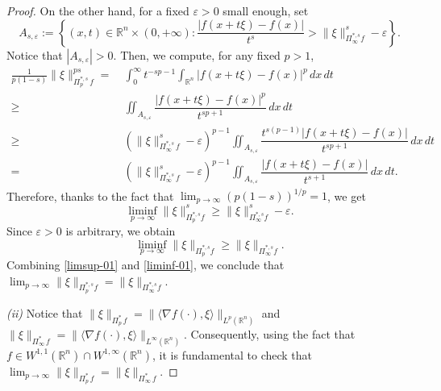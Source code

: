 \documentclass[11pt, reqno]{article}
\theoremstyle{definition}
\numberwithin{equation}{section}
\newcommand{\R}{\mathbb{R}}
\begin{document}
\begin{proof}
\medskip

On the other hand, for a fixed $\varepsilon > 0$ small enough, set
    \begin{equation}\label{A_s_epsi}
        A_{s, \varepsilon} := \left \{   (x, t) \in \R^n \times (0, + \infty): \dfrac{|f(x + t\xi) - f(x)|}{t^s} > \|\xi \|^s_{\Pi^{\ast, s}_\infty f} - \varepsilon \right\}.
    \end{equation}
Notice that $|A_{s, \varepsilon}| > 0$.
Then, we compute, for any fixed $p > 1$,
    \begin{equation}\label{est.A_s_epsi}
    	\begin{split}
         \frac{1}{p(1- s)}\|\xi\|^{ps}_{\Pi^{\ast, s}_p \, f} = & ~ \int_0^\infty t^{-sp - 1} \int_{\R^n} |f(x + t \xi) - f(x)|^p \, dx \, dt \\
         \geq &  ~  \iint_{A_{s, \varepsilon}} \dfrac{|f(x + t\xi) - f(x)|^p}{t^{sp + 1}} \, dx \, dt \\
         \geq & ~ \left( \| \xi \|^s_{\Pi^{\ast, s}_\infty \, f} - \varepsilon \right)^{p - 1} \iint_{A_{s,\varepsilon}} \dfrac{t^{s(p - 1)}|f(x +t\xi) - f(x)|}{t^{sp + 1}} \, dx \, dt  \\
         = & ~ \left( \| \xi \|^s_{\Pi^{\ast, s}_\infty \, f} - \varepsilon \right)^{p - 1}\iint_{A_{s, \varepsilon}} \dfrac{|f(x +t\xi) - f(x)|}{t^{s + 1}} \, dx \, dt.
         \end{split}
    \end{equation}
Therefore, thanks to the fact that $\textstyle\lim_{p \to \infty} (p(1-s))^{1/p} = 1$, we get
    \[
        \liminf_{p \to \infty} \| \xi \|^s_{\Pi^{\ast, s}_p f} \geq \| \xi \|^s_{\Pi^{\ast, s}_\infty f} - \varepsilon.
    \]
Since $\varepsilon > 0$ is arbitrary, we obtain
    \begin{equation}\label{liminf-01}
        \liminf_{p \to \infty} \| \xi \|_{\Pi^{\ast, s}_p f} \geq \| \xi \|_{\Pi^{\ast, s}_\infty f}.
    \end{equation}
Combining \eqref{limsup-01} and \eqref{liminf-01}, we conclude that $\textstyle\lim_{p \to \infty}  \| \xi \|_{\Pi^{\ast, s}_p f} = \| \xi \|_{\Pi^{\ast, s}_\infty  f}$.

\medskip

\textit{(ii)}
Notice that $\| \xi \|_{\Pi^\ast_p \, f} = \| \langle \nabla f (\cdot), \xi \rangle \|_{L^p(\R^n)}$ and $\| \xi \|_{\Pi^\ast_\infty \, f} = \| \langle \nabla f(\cdot), \xi \rangle \|_{L^\infty(\R^n)}$.
Consequently, using the fact that $f \in W^{1, 1}(\R^n) \cap W^{1, \infty}(\R^n)$, it is fundamental to check that $\textstyle\lim_{p \to \infty} \| \xi \|_{\Pi^\ast_p \, f} = \| \xi \|_{\Pi^\ast_\infty \, f}$. 


\end{proof}
\end{document}
